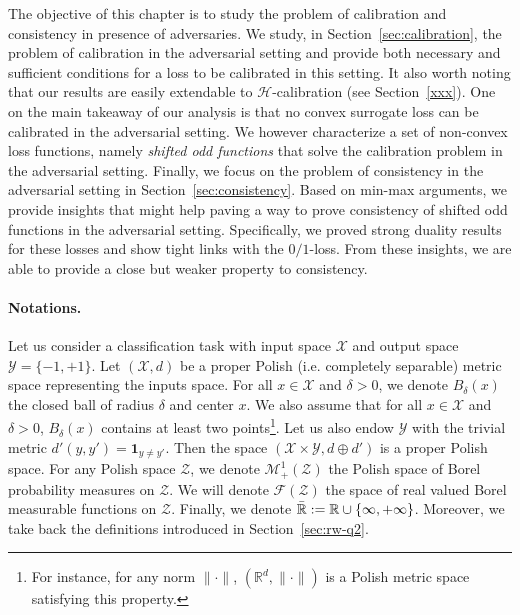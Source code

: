 




The objective of this chapter is to study the problem of calibration and consistency in presence of adversaries. We study, in Section~\ref{sec:calibration}, the problem of calibration in the adversarial setting and provide both necessary and sufficient conditions for a loss to be calibrated in this setting. It also worth noting that our results are easily extendable to  $\mathcal{H}$-calibration (see Section~\ref{xxx}). One on the main takeaway of our analysis is that  no convex surrogate loss can be calibrated in the adversarial setting. We however characterize a set of non-convex loss functions, namely \emph{shifted odd functions} that solve the calibration problem in the adversarial setting. Finally, we focus on the problem of consistency in the adversarial setting in Section~\ref{sec:consistency}. Based on min-max arguments, we provide insights that might help paving a way to prove consistency of shifted odd functions in the adversarial setting. Specifically, we proved strong duality results for these losses and show tight links with the $0/1$-loss. From these insights, we are able to provide a close but weaker property to consistency.

\paragraph{Notations.} Let us consider a classification task with input space $\mathcal{X}$ and output space $\mathcal{Y}=\{-1,+1\}$. Let $(\mathcal{X},d)$ be a proper Polish (i.e. completely separable) metric space representing the inputs space. For all $x\in\mathcal{X}$ and $\delta>0$, we denote $B_\delta(x)$ the closed ball of radius $\delta$ and center $x$. We also assume that for all $x\in\mathcal{X}$ and $\delta>0$,  $B_\delta(x)$ contains at least two points\footnote{For instance, for any norm $\lVert\cdot\rVert$,  $(\mathbb{R}^d,\lVert \cdot \rVert)$ is a Polish metric space satisfying this property.}. Let us also endow $\mathcal{Y}$ with the trivial metric  $d'(y,y') = \mathbf{1}_{y\neq y'}$. Then the space $(\mathcal{X}\times\mathcal{Y},d\oplus d')$ is a proper Polish space. For any Polish space $\mathcal{Z}$, we denote $\mathcal{M}_+^1(\mathcal{Z})$ the Polish space of Borel probability measures on $\mathcal{Z}$. We will denote $\mathcal{F}(\mathcal{Z})$ the space of real valued Borel measurable functions on $\mathcal{Z}$. Finally, we denote $\bar{\mathbb{R}}:=\mathbb{R}\cup\{\-\infty,+\infty\}$. Moreover, we take back the definitions introduced in Section~\ref{sec:rw-q2}.








